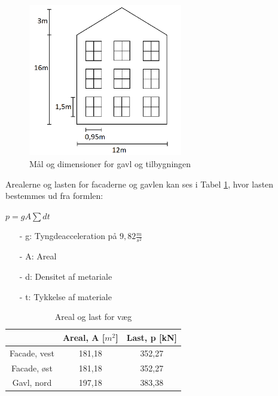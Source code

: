 \begin{figure}[H]
	\centering
	\includegraphics[width=0.6\textwidth]{billeder/facadevestellerost.png}
	\caption{Mål og dimensioner for gavl og tilbygningen}
	\label{fig:gavl}
\end{figure}

Arealerne og lasten for facaderne og gavlen kan ses i Tabel \ref{tab:arealoglast}, hvor lasten bestemmes ud fra formlen:
\begin{center}
	$p = g A \sum dt$
\end{center}

\begin{itemize}
	\item[-] g: Tyngdeacceleration på $9,\!82 \frac{m}{s^2}$
	\item[-] A: Areal
	\item[-] d: Densitet af metariale
	\item[-] t: Tykkelse af materiale
\end{itemize}

\begin{table}
	\begin{center}
		\begin{tabular}{|c|c|c|}
			\hline
			& Areal, A [$m^2$]   & Last, p [kN]    \\ \hline
			Facade, vest & 181,18 & 352,27 \\ \hline
			Facade, øst  & 181,18 & 352,27 \\ \hline
			Gavl, nord   & 197,18 & 383,38 \\ \hline
		\end{tabular}
		\caption{Areal og last for væg}
		\label{tab:arealoglast}
	\end{center}
\end{table}

